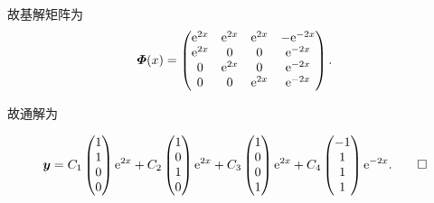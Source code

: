 \begin{solution}
  故基解矩阵为
  \[\bm{\varPhi}(x) = 
  \begin{pmatrix}
    \mathrm{e}^{2x}&\mathrm{e}^{2x}&\mathrm{e}^{2x}&-\mathrm{e}^{-2x} \\
    \mathrm{e}^{2x}&0&0&\mathrm{e}^{-2x} \\
    0&\mathrm{e}^{2x}&0&\mathrm{e}^{-2x} \\
    0&0&\mathrm{e}^{2x}&\mathrm{e}^{-2x}
  \end{pmatrix}.\]

  故通解为

  \[\bm{y} = 
    C_1\begin{pmatrix}1\\1\\0\\0\end{pmatrix}\mathrm{e}^{2x}
    + C_2\begin{pmatrix}1\\0\\1\\0\end{pmatrix}\mathrm{e}^{2x}+C_3\begin{pmatrix}1\\0\\0\\1\end{pmatrix}\mathrm{e}^{2x}
    + C_4\begin{pmatrix}-1\\1\\1\\1\end{pmatrix}\mathrm{e}^{-2x}.\qedhere\]
\end{solution}



